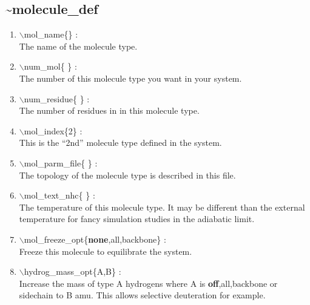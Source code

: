 \documentclass[12pt]{article}
\begin{document}

\newpage
\subsection*{\bf \~{}molecule\_def}

\begin{enumerate}

 \vspace{0.15in} 
 \item  $\backslash$mol\_name\{\} : \\
   The name of the molecule type.

 \vspace{0.15in} 
 \item  $\backslash$num\_mol\{ \} : \\ 
   The number of this molecule type you want in your system.

 \vspace{0.15in} 
 \item  $\backslash$num\_residue\{ \} : \\
   The number of residues in in this molecule type.

 \vspace{0.15in} 
 \item  $\backslash$mol\_index\{2\} : \\ 
   This is the ``2nd'' molecule type defined in the system.

 \vspace{0.15in} 
 \item  $\backslash$mol\_parm\_file\{ \} : \\
   The topology of the molecule type is described in this file.

 \vspace{0.15in} 
 \item  $\backslash$mol\_text\_nhc\{ \} : \\
   The temperature of this molecule type. It may be different than the
   external temperature for fancy simulation studies in the adiabatic limit.

 \vspace{0.15in} 
 \item  $\backslash$mol\_freeze\_opt\{{\bf none},all,backbone\} : \\
    Freeze this molecule to equilibrate the system.

 \vspace{0.15in} 
 \item  $\backslash$hydrog\_mass\_opt\{A,B\} : \\
   Increase the mass of type A hydrogens where A is 
   {\bf off},all,backbone or sidechain to B amu. This allows
   selective deuteration for example.


\end{enumerate}
\end{document}
